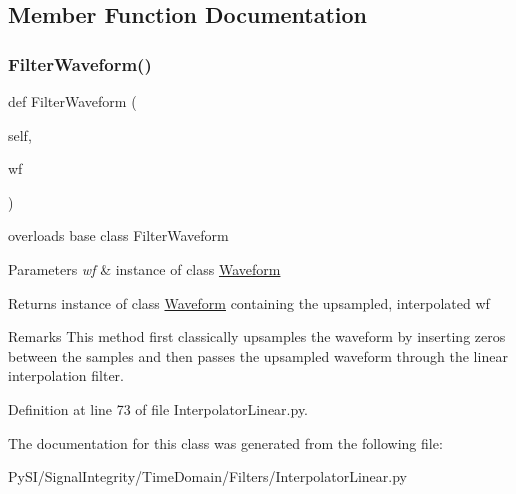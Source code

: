\subsection{Member Function Documentation}
\mbox{\label{classSignalIntegrity_1_1TimeDomain_1_1Filters_1_1InterpolatorLinear_1_1InterpolatorLinear_a84e73c18250ca4a61482f94ad61e735b}} 
\subsubsection{\texorpdfstring{Filter\+Waveform()}{FilterWaveform()}}
{\footnotesize\ttfamily def Filter\+Waveform (\begin{DoxyParamCaption}\item[{}]{self,  }\item[{}]{wf }\end{DoxyParamCaption})}



overloads base class Filter\+Waveform 


\begin{DoxyParams}{Parameters}
{\em wf} & instance of class \hyperlink{namespaceSignalIntegrity_1_1TimeDomain_1_1Waveform}{Waveform} \\
\hline
\end{DoxyParams}
\begin{DoxyReturn}{Returns}
instance of class \hyperlink{namespaceSignalIntegrity_1_1TimeDomain_1_1Waveform}{Waveform} containing the upsampled, interpolated wf 
\end{DoxyReturn}
\begin{DoxyRemark}{Remarks}
This method first classically upsamples the waveform by inserting zeros between the samples and then passes the upsampled waveform through the linear interpolation filter. 
\end{DoxyRemark}


Definition at line 73 of file Interpolator\+Linear.\+py.



The documentation for this class was generated from the following file\+:\begin{DoxyCompactItemize}
\item 
Py\+S\+I/\+Signal\+Integrity/\+Time\+Domain/\+Filters/Interpolator\+Linear.\+py\end{DoxyCompactItemize}
